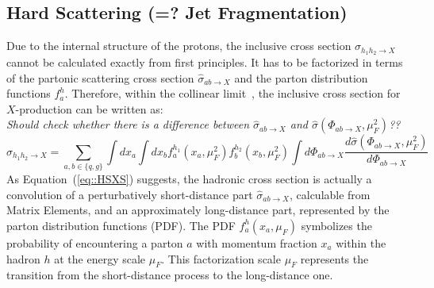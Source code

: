 \subsection{Hard Scattering (=? Jet Fragmentation)} \label{sec::HardScattering}
Due to the internal structure of the protons, the inclusive cross section $\sigma_{h_{1}h_{2} \rightarrow X}$ cannot be calculated exactly from first principles. It has to be factorized in terms of the partonic scattering cross section $\hat{\sigma}_{ab \rightarrow X}$ and the parton distribution functions $f_{a}^{h}$. Therefore, within the collinear limit~\cite{ColLimit}, the inclusive cross section for $X$-production can be written as:
\\ \textit{Should check whether there is a difference between $\hat{\sigma}_{ab \rightarrow X}$ and $\hat{\sigma}(\Phi_{ab \rightarrow X},\mu^{2}_{F})$??}
\begin{equation} \label{eq::HSXS}
 \sigma_{h_{1}h_{2} \rightarrow X} =\sum_{a,b \in \{q,g\} } \int dx_{a} \int dx_{b} f_{a}^{h_{1}}(x_{a},\mu^{2}_{F}) f_{b}^{h_{2}}(x_{b},\mu^{2}_{F}) \int d\Phi_{ab \rightarrow X} \dfrac{d\hat{\sigma}(\Phi_{ab \rightarrow X},\mu^{2}_{F})}{d\Phi_{ab \rightarrow X}}
\end{equation}
As Equation~(\ref{eq::HSXS}) suggests, the hadronic cross section is actually a convolution of a perturbatively short-distance part $\hat{\sigma}_{ab \rightarrow X}$, calculable from Matrix Elements, and an approximately long-distance part, represented by the parton distribution functions (PDF). The PDF $f_{a}^{h}(x_{a},\mu_{F})$ symbolizes the probability of encountering a parton $a$ with momentum fraction $x_a$ within the hadron $h$ at the energy scale $\mu_{F}$. This factorization scale $\mu_{F}$ represents the transition from the short-distance process to the long-distance one.\\
